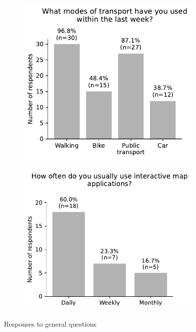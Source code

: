 \begin{appendices}
\begin{figure}[H]
\begin{subfigure}[b]{0.5\textwidth}
	\end{subfigure}%
	\newline
	\begin{subfigure}[b]{0.5\textwidth}  %
		\includegraphics[width=\textwidth]{visual/figures/survey/modes.pdf}
	\end{subfigure}%
	\begin{subfigure}[b]{0.5\textwidth}
		\includegraphics[width=\textwidth]{visual/figures/survey/12.pdf}
	\end{subfigure}%
	\newline
	Responses to general questions
\end{figure}


\end{appendices}
